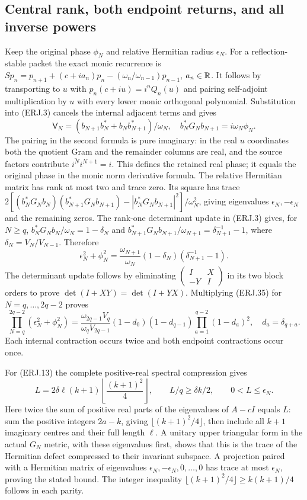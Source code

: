 \subsection{Central rank, both endpoint returns, and all inverse powers}
Keep the original phase $\phi_N$ and relative Hermitian radius
$\epsilon_N$. For a reflection-stable packet the exact monic recurrence
is $Sp_n=p_{n+1}+(c+ia_n)p_n-(\omega_n/\omega_{n-1})p_{n-1}$,
$a_n\in\mathbb R$. It follows by transporting to $u$ with
$p_n(c+iu)=i^nQ_n(u)$ and pairing self-adjoint multiplication by $u$
with every lower monic orthogonal polynomial. Substitution into
(ERJ.3) cancels the internal adjacent terms and gives
\[
 \mathsf V_N=(b_{N+1}b_N^*+b_Nb_{N+1}^*)/\omega_N,
 \quad b_N^*G_Nb_{N+1}=i\omega_N\phi_N.
 \tag{ERJ.34}
\]
The pairing in the second formula is pure imaginary: in the real
$u$ coordinates both the quotient Gram and the remainder columns
are real, and the source factors contribute
$\overline{i^N}i^{N+1}=i$. This defines the retained real phase;
it equals the original phase in the monic norm derivative formula.
The relative Hermitian matrix has rank at most two and trace zero.
Its square has trace
$2[(b_N^*G_Nb_N)(b_{N+1}^*G_Nb_{N+1})-
|b_N^*G_Nb_{N+1}|^2]/\omega_N^2$, giving eigenvalues
$\epsilon_N,-\epsilon_N$ and the remaining zeros.
The rank-one determinant update in (ERJ.3) gives, for $N\ge q$,
$b_N^*G_Nb_N/\omega_N=1-\delta_N$ and
$b_{N+1}^*G_Nb_{N+1}/\omega_{N+1}=\delta_{N+1}^{-1}-1$,
where $\delta_N=V_N/V_{N-1}$. Therefore
\[
 \epsilon_N^2+\phi_N^2=
 \frac{\omega_{N+1}}{\omega_N}(1-\delta_N)
 (\delta_{N+1}^{-1}-1).\tag{ERJ.35}
\]
The determinant update follows by eliminating
$\left(\begin{smallmatrix}I&X\\-Y&I\end{smallmatrix}\right)$
in its two block orders to prove $\det(I+XY)=\det(I+YX)$.
Multiplying (ERJ.35) for $N=q,\ldots,2q-2$ proves
\[
 \prod_{N=q}^{2q-2}(\epsilon_N^2+\phi_N^2)
 =\frac{\omega_{2q-1}V_q}{\omega_qV_{2q-1}}
 (1-d_0)(1-d_{q-1})\prod_{a=1}^{q-2}(1-d_a)^2,
 \quad d_a=\delta_{q+a}.\tag{ERJ.36}
\]
Each internal contraction occurs twice and both endpoint contractions
occur once.

For (ERJ.13) the complete positive-real spectral compression gives
\[
 L=2\delta\ell(k+1)\left\lfloor\frac{(k+1)^2}{4}\right\rfloor,
 \qquad L/q\ge\delta k/2,\qquad0<L\le\epsilon_N.
 \tag{ERJ.37}
\]
Here twice the sum of positive real parts of the eigenvalues of
$A-cI$ equals $L$: sum the positive integers $2a-k$, giving
$\lfloor(k+1)^2/4\rfloor$, then include all $k+1$ imaginary
centres and their full length $\ell$. A unitary upper triangular form
in the actual $G_N$ metric, with these eigenvalues first, shows that
this is the trace of the Hermitian defect compressed to their invariant
subspace. A projection paired with a Hermitian matrix of eigenvalues
$\epsilon_N,-\epsilon_N,0,\ldots,0$ has trace at most
$\epsilon_N$, proving the stated bound. The integer inequality
$\lfloor(k+1)^2/4\rfloor\ge k(k+1)/4$ follows in each parity.

